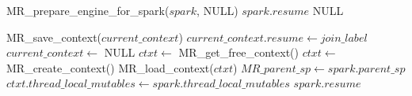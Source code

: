 \begin{algorithm}
\begin{algorithmic}
            \State MR\_prepare\_engine\_for\_spark($spark$, NULL)
            \State \Return $spark.resume$
        \EndIf
    \EndIf
    \State \Return NULL
\EndProcedure
\end{algorithmic}
\end{algorithm}

\begin{algorithm}
\begin{algorithmic}
        \State MR\_save\_context($current\_context$)
        \State $current\_context.resume \gets join\_label$
        \State $current\_context \gets$ NULL
    \EndIf
        \State $ctxt \gets$ MR\_get\_free\_context()
            \State $ctxt \gets$ MR\_create\_context()
        \EndIf
        \State MR\_load\_context($ctxt$)
    \EndIf
    \State $MR\_parent\_sp \gets spark.parent\_sp$
    \State $ctxt.thread\_local\_mutables \gets
      spark.thread\_local\_mutables$
    \State \Return $spark.resume$
\EndProcedure
\end{algorithmic}
\end{algorithm}

